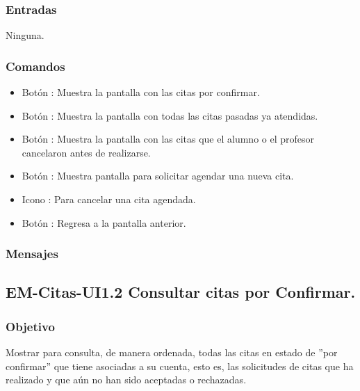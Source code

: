 \subsubsection{Entradas}
	\noindent
	Ninguna.

\subsubsection{Comandos}
	\begin{itemize}
		\item Botón : Muestra la pantalla con las citas por confirmar.
		\item Botón : Muestra la pantalla con todas las citas pasadas ya atendidas.
		\item Botón : Muestra la pantalla con las citas que el alumno o el profesor cancelaron antes de realizarse.
		\item Botón \IUbutton{ + }: Muestra pantalla para solicitar agendar una nueva cita.
		\item Icono : Para cancelar una cita agendada.
		\item Botón : Regresa a la pantalla anterior.
	\end{itemize}

\subsubsection{Mensajes}
	\begin{Citemize}
		\item {}
	\end{Citemize}

\pagebreak

\subsection{EM-Citas-UI1.2 Consultar citas por Confirmar.}

\subsubsection{Objetivo}
	\noindent
	Mostrar para consulta, de manera ordenada, todas las citas en estado de ''por confirmar'' que tiene asociadas a su cuenta, esto es, las solicitudes de citas que ha realizado y que aún no han sido aceptadas o rechazadas. 

